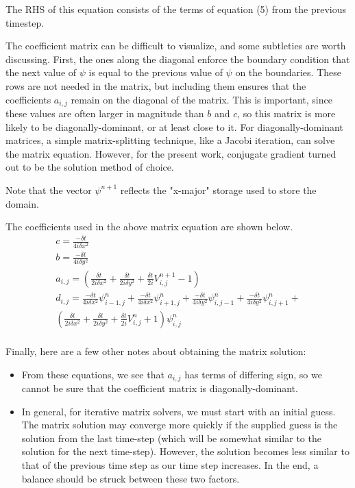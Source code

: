 \documentclass[letterpaper,12pt]{article}
\begin{document}
The RHS of this equation consists of the terms of equation (5) from the previous timestep.  

The coefficient matrix can be difficult to visualize, and some subtleties are worth discussing.  First, the ones along the diagonal enforce the boundary condition that the next value of $\psi$ is equal to the previous value of $\psi$ on the boundaries.  These rows are not needed in the matrix, but including them ensures that the coefficients $a_{i,j}$ remain on the diagonal of the matrix.  This is important, since these values are often larger in magnitude than $b$ and $c$, so this matrix is more likely to be diagonally-dominant, or at least close to it.  For diagonally-dominant matrices, a simple matrix-splitting technique, like a Jacobi iteration, can solve the matrix equation. However, for the present work, conjugate gradient turned out to be the solution method of choice.

Note that the vector $\psi^{n+1}$ reflects the "x-major" storage used to store the domain.   

The coefficients used in the above matrix equation are shown below.
\begin{equation}
\begin{split}
c = \frac{-\delta t}{4i\delta x^2} \\
b = \frac{-\delta t}{4i\delta y^2} \\
a_{i,j} = (  \frac{\delta t}{2i\delta x^2} + \frac{\delta t}{2i\delta y^2} + \frac{\delta t} {2i}V^{n+1}_{i,j} - 1) \\
d_{i,j} = 	\frac{-\delta t}{4i\delta x^2}\psi^n_{i-1,j} + 
			\frac{-\delta t}{4i\delta x^2}\psi^n_{i+1,j} +
			\frac{-\delta t}{4i\delta y^2}\psi^n_{i,j-1} + 
 			\frac{-\delta t}{4i\delta y^2}\psi^n_{i,j+1} + \\ 
			(  \frac{\delta t}{2i\delta x^2} + \frac{\delta t}{2i\delta y^2} + \frac{\delta t} 				{2i}V^n_{i,j} + 1)\psi^n_{i,j}\\
\end{split}
\end{equation}

Finally, here are a few other notes about obtaining the matrix solution:
\begin{itemize}
  \item From these equations, we see that $a_{i,j}$ has terms of differing sign, so we cannot be sure that the coefficient matrix is diagonally-dominant.
  \item In general, for iterative matrix solvers, we must start with an initial guess.  The matrix solution may converge more quickly if the supplied guess is the solution from the last time-step (which will be somewhat similar to the solution for the next time-step). However, the solution becomes less similar to that of the previous time step as our time step increases.  In the end, a balance should be struck between these two factors.
  \end{itemize}
\end{document}
